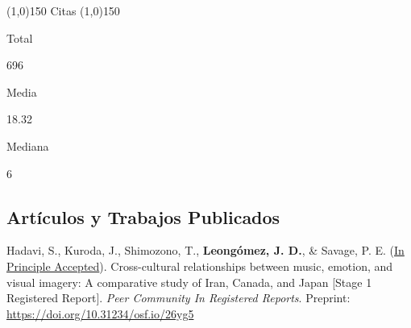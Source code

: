 \documentclass[11pt,a4paper,]{awesome-cv}
\begin{document}
\begin{tcolorbox}[enhanced,
        on line, 
        boxsep=4pt, left=0pt,right=0pt,top=0pt,bottom=0pt,
        colframe=white,colback=teal,
        hyperurl={https://scholar.google.com/citations?user=8Q0jKHsAAAAJ}]
  \begin{center} \noindent\line(1,0){150} Citas \noindent\line(1,0){150} \end{center}
  
  \begin{minipage}[c]{0.325\linewidth}  
    \begin{center} 
      \begin{small} Total \end{small} 
      \begin{LARGE} 696 \end{LARGE} 
    \end{center}
  \end{minipage} 
  \begin{minipage}[c]{0.325\linewidth}
    \begin{center} 
      \begin{small} Media \end{small} 
      \begin{LARGE} 18.32 \end{LARGE}
    \end{center}
  \end{minipage} 
  \begin{minipage}[c]{0.325\linewidth}
    \begin{center}  
      \begin{small} Mediana \end{small} 
      \begin{LARGE} 6 \end{LARGE}
   \end{center}
  \end{minipage} 
\end{tcolorbox}

\hypertarget{section}{%
\subsection{\texorpdfstring{\textbf{Artículos y Trabajos Publicados}}{}}\label{section}}

\begingroup
\footnotesize
\setlength{\parindent}{-0.5in}
\setlength{\leftskip}{0.5in}

Hadavi, S., Kuroda, J., Shimozono, T., \textbf{Leongómez, J. D.}, \&
Savage, P. E.
(\href{https://rr.peercommunityin.org/articles/rec?id=416}{In Principle
Accepted}). Cross-cultural relationships between music, emotion, and
visual imagery: A comparative study of Iran, Canada, and Japan {[}Stage
1 Registered Report{]}. \emph{Peer Community In Registered Reports}.
Preprint: \url{https://doi.org/10.31234/osf.io/26yg5}
\end{document}
